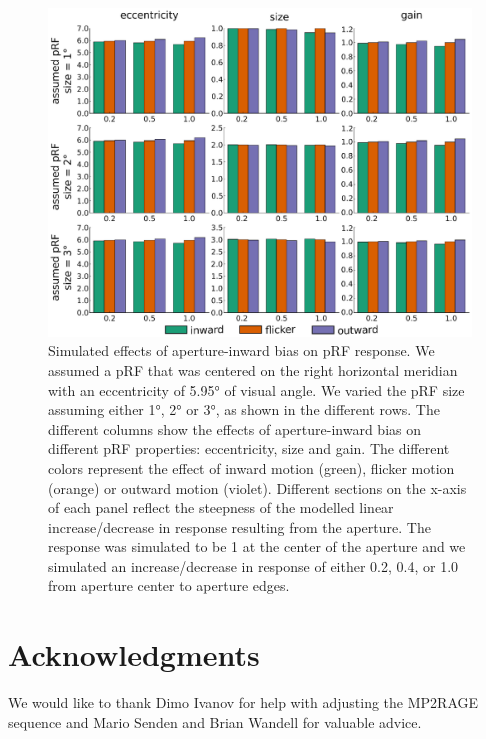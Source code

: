 \begin{figure}[htbp!]
\centering
\includegraphics[width=\textwidth]{figures/chapter_04/fig5b.eps}
\caption{Simulated effects of aperture-inward bias on pRF response. We assumed a pRF that was centered on the right horizontal meridian with an eccentricity of 5.95° of visual angle. We varied the pRF size assuming either 1°, 2° or 3°, as shown in the different rows. The different columns show the effects of aperture-inward bias on different pRF properties: eccentricity, size and gain. The different colors represent the effect of inward motion (green), flicker motion (orange) or outward motion (violet). Different sections on the x-axis of each panel reflect the steepness of the modelled linear increase/decrease in response resulting from the aperture. The response was simulated to be 1 at the center of the aperture and we simulated an increase/decrease in response of either 0.2, 0.4, or 1.0 from aperture center to aperture edges.}
\label{fig:trlEdge_res}
\end{figure}

\clearpage
\section{Acknowledgments}
We would like to thank Dimo Ivanov for help with adjusting the MP2RAGE sequence and Mario Senden and Brian Wandell for valuable advice.

\stopsupplement
\clearpage
\printbibliography[heading=subbibnumbered, title={References}]
